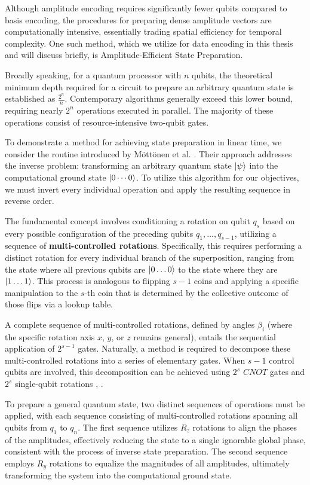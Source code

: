 \documentclass[en]{dimscthesis}
\begin{document}
Although amplitude encoding requires significantly fewer qubits compared to basis encoding, the procedures for preparing dense amplitude vectors are computationally intensive, essentially trading spatial efficiency for temporal complexity. One such method, which we utilize for data encoding in this thesis and will discuss briefly, is Amplitude-Efficient State Preparation.

Broadly speaking, for a quantum processor with $n$ qubits, the theoretical minimum depth required for a circuit to prepare an arbitrary quantum state is established as $\frac{2^n}{n}$. Contemporary algorithms generally exceed this lower bound, requiring nearly $2^n$ operations executed in parallel. The majority of these operations consist of resource-intensive two-qubit gates.

To demonstrate a method for achieving state preparation in linear time, we consider the routine introduced by Möttönen et al. \cite{bib:mottonen}. Their approach addresses the inverse problem: transforming an arbitrary quantum state $\ket{\psi}$ into the computational ground state $\ket{0\cdots0}$. To utilize this algorithm for our objectives, we must invert every individual operation and apply the resulting sequence in reverse order.

The fundamental concept involves conditioning a rotation on qubit $q_s$ based on every possible configuration of the preceding qubits $q_1, \dots, q_{s-1}$, utilizing a sequence of \textbf{multi-controlled rotations}. Specifically, this requires performing a distinct rotation for every individual branch of the superposition, ranging from the state where all previous qubits are $\ket{0\dots0}$ to the state where they are $\ket{1\dots1}$. This process is analogous to flipping $s-1$ coins and applying a specific manipulation to the $s$-th coin that is determined by the collective outcome of those flips via a lookup table.

A complete sequence of multi-controlled rotations, defined by angles $\beta_i$ (where the specific rotation axis $x$, $y$, or $z$ remains general), entails the sequential application of $2^{s-1}$ gates. Naturally, a method is required to decompose these multi-controlled rotations into a series of elementary gates. When $s-1$ control qubits are involved, this decomposition can be achieved using $2^s$ $CNOT$ gates and $2^s$ single-qubit rotations \cite{bib:mottonen}, \cite{bib:mottonen_2}.

To prepare a general quantum state, two distinct sequences of operations must be applied, with each sequence consisting of multi-controlled rotations spanning all qubits from $q_1$ to $q_n$. The first sequence utilizes $R_z$ rotations to align the phases of the amplitudes, effectively reducing the state to a single ignorable global phase, consistent with the process of inverse state preparation. The second sequence employs $R_y$ rotations to equalize the magnitudes of all amplitudes, ultimately transforming the system into the computational ground state.
\end{document}
